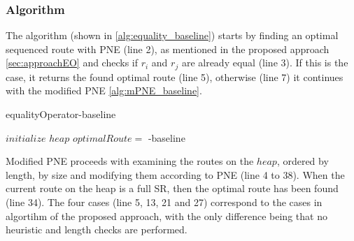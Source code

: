 \subsubsection{Algorithm}
The algorithm (shown in \ref{alg:equality_baseline}) starts by finding an optimal sequenced route with PNE (line 2), as mentioned in the proposed approach \ref{sec:approachEO} and checks if $r_i$ and $r_j$ are already equal (line 3). If this is the case, it returns the found optimal route (line 5), otherwise (line 7) it continues with the modified PNE \ref{alg:mPNE_baseline}. 

\raggedbottom

\begin{algorithm}[H]
	\label{alg:equality_baseline}
	\caption{equalityOperator-baseline}
	
	
	\BlankLine
	
	$initialize$ $heap$ 
	$optimalRoute =$\;
	{
		\modifiedPNE-baseline{}\;
	}
\end{algorithm}

Modified PNE proceeds with examining the routes on the $heap$, ordered by length, by size and modifying them according to PNE (line 4 to 38). When the current route on the heap is a full SR, then the optimal route has been found (line 34). The four cases (line 5, 13, 21 and 27) correspond to the cases in algortihm of the proposed approach, with the only difference being that no heuristic and length checks are performed. \newline

